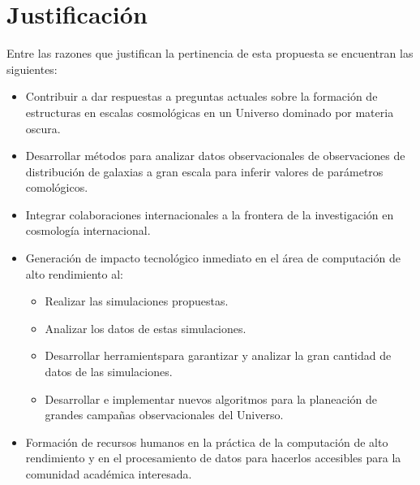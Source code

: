 
\section{Justificaci\'on}

Entre las razones que justifican la pertinencia de esta propuesta se
encuentran las siguientes:

\begin{itemize}
\item Contribuir a dar respuestas a preguntas actuales sobre la
  formaci\'on de estructuras en escalas cosmol\'ogicas en un Universo
  dominado por materia oscura.
\item Desarrollar m\'etodos para analizar datos observacionales de
  observaciones de distribuci\'on de galaxias a gran escala para
  inferir valores de par\'ametros comol\'ogicos.
\item Integrar colaboraciones internacionales a la frontera de la
  investigaci\'on en cosmolog\'ia internacional.
\item Generaci\'on de impacto tecnol\'ogico inmediato en el \'area de
  computaci\'on de alto rendimiento al:
\begin{itemize}
\item Realizar las simulaciones propuestas.
\item Analizar los datos de estas simulaciones.
\item Desarrollar herramientspara garantizar y analizar la
  gran cantidad de datos de las simulaciones.
\item Desarrollar e implementar nuevos algoritmos para la planeaci\'on
  de grandes campa\~nas observacionales del Universo.
\end{itemize}
\item Formaci\'on de recursos humanos en la pr\'actica de la
  computaci\'on de alto rendimiento y en el procesamiento de datos
  para hacerlos accesibles para la comunidad acad\'emica interesada. 
\end{itemize}
